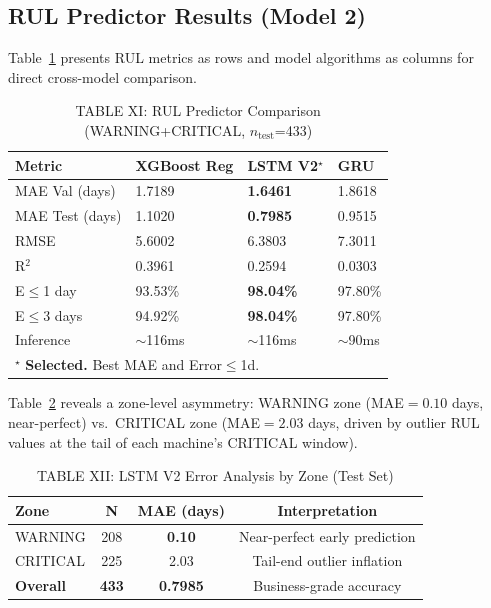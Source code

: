 \documentclass[conference]{IEEEtran}
\begin{document}
\subsection{RUL Predictor Results (Model 2)}

Table~\ref{tab:rul_results} presents RUL metrics as rows and model algorithms
as columns for direct cross-model comparison.

\begin{table}[htbp]
\caption{TABLE XI: RUL Predictor Comparison (WARNING+CRITICAL, $n_\text{test}$=433)}
\centering
\begin{tabular}{lp{1.5cm}p{1.5cm}p{1.5cm}}
\hline
\textbf{Metric} & \textbf{XGBoost Reg} & \textbf{LSTM V2}$^\star$ & \textbf{GRU} \\
\hline
MAE Val (days)  & 1.7189  & \textbf{1.6461}  & 1.8618 \\
MAE Test (days) & 1.1020  & \textbf{0.7985}  & 0.9515 \\
RMSE            & 5.6002  & 6.3803           & 7.3011 \\
R$^2$           & 0.3961  & 0.2594           & 0.0303 \\
E$\leq$1 day    & 93.53\% & \textbf{98.04\%} & 97.80\% \\
E$\leq$3 days   & 94.92\% & \textbf{98.04\%} & 97.80\% \\
Inference       & $\sim$116ms & $\sim$116ms & $\sim$90ms \\
\hline
\multicolumn{4}{l}{$^\star$ \textbf{Selected.} Best MAE and Error$\leq$1d.} \\
\hline
\end{tabular}
\label{tab:rul_results}
\end{table}

Table~\ref{tab:lstm_zone} reveals a zone-level asymmetry: WARNING zone
(MAE$=0.10$ days, near-perfect) vs.\ CRITICAL zone (MAE$=2.03$ days, driven
by outlier RUL values at the tail of each machine's CRITICAL window).

\begin{table}[htbp]
\caption{TABLE XII: LSTM V2 Error Analysis by Zone (Test Set)}
\centering
\begin{tabular}{lccc}
\hline
\textbf{Zone} & \textbf{N} & \textbf{MAE (days)} & \textbf{Interpretation} \\
\hline
WARNING          & 208          & \textbf{0.10}   & Near-perfect early prediction \\
CRITICAL         & 225          & 2.03            & Tail-end outlier inflation \\
\hline
\textbf{Overall} & \textbf{433} & \textbf{0.7985} & Business-grade accuracy \\
\hline
\end{tabular}
\label{tab:lstm_zone}
\end{table}
\end{document}
